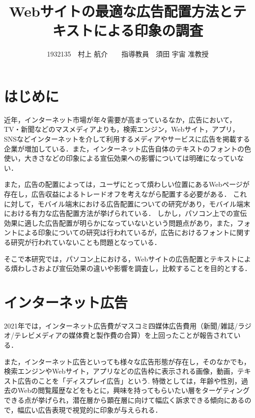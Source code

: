 \documentclass[twocolumn,10pt,a4j]{ltjsarticle}
\title{Webサイトの最適な広告配置方法とテキストによる印象の調査}
\author{1932135　村上 航介　　指導教員　須田 宇宙 准教授}
\date{}
\begin{document}
\maketitle

\section{はじめに}
近年，インターネット市場が年々需要が高まっているなか，広告において，TV・新聞などのマスメディアよりも，検索エンジン，Webサイト，アプリ，SNSなどインターネットを介して利用するメディアやサービスに広告を掲載する企業が増加している．また，インターネット広告自体のテキストのフォントの色使い，大きさなどの印象による宣伝効果への影響については明確になっていない．

また，広告の配置によっては，ユーザにとって煩わしい位置にあるWebページが存在し，広告収益によるトレードオフを考えながら配置する必要がある．
これに対して，モバイル端末における広告配置についての研究があり，モバイル端末における有力な広告配置方法が挙げられている\cite{mobile}．
しかし，パソコン上での宣伝効果に適した広告配置が明らかになっていないという問題点があり，また，フォントによる印象についての研究は行われているが，広告におけるフォントに関する研究が行われていないことも問題となっている．

そこで本研究では，パソコン上における，Webサイトの広告配置とテキストによる煩わしさおよび宣伝効果の違いや影響を調査し，比較することを目的とする．

\section{インターネット広告}
2021年では，インターネット広告費がマスコミ四媒体広告費用（新聞/雑誌/ラジオ/テレビメディアの媒体費と製作費の合算）を上回ったことが報告されている\cite{dentsu}．

また，インターネット広告といっても様々な広告形態が存在し，そのなかでも，検索エンジンやWebサイト，アプリなどの広告枠に表示される画像，動画，テキスト広告のことを「ディスプレイ広告」という.
特徴としては，年齢や性別，過去のWebの閲覧履歴などをもとに，興味を持ってもらいたい層をターゲティングできる点が挙げられ，潜在層から顕在層に向けて幅広く訴求できる傾向にあるので，幅広い広告表現で視覚的に印象が与えられる．
\end{document}
